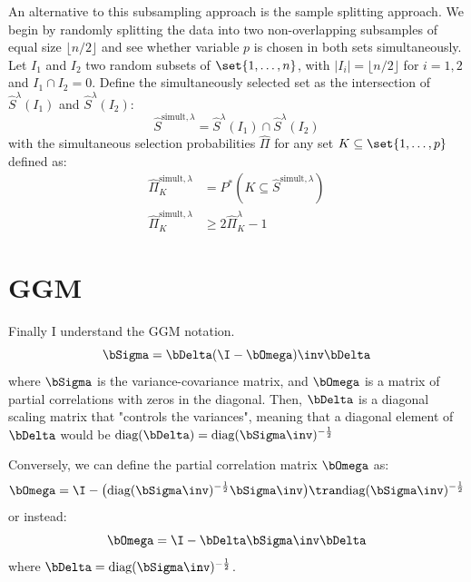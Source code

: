 An alternative to this subsampling approach is the sample splitting approach. We begin by randomly splitting the data into two non-overlapping subsamples of equal size $\lfloor n/2 \rfloor$ and see whether variable $p$ is chosen in both sets simultaneously. Let $I_1$ and $I_2$ two random subsets of $\set{1,\ldots,n}$, with $|I_i| = \lfloor n/2 \rfloor$ for $i = 1,2$ and $I_1 \cap I_2 = 0$. Define the simultaneously selected set as the intersection of $\hat{S}^{\lambda}(I_1)$ and $\hat{S}^{\lambda}(I_2)$:
\begin{equation}
    \hat{S}^{\text{simult},\lambda} = \hat{S}^{\lambda}(I_1) \cap \hat{S}^{\lambda}(I_2)
\end{equation}
with the simultaneous selection probabilities $\hat{\Pi}$ for any set $K \subseteq \set{1,\ldots,p}$ defined as:
\begin{equation}
    \begin{split}
        \hat{\Pi}_K^{\text{simult},\lambda} &= P^*(K\subseteq\hat{S}^{\text{simult},\lambda}) \\
        \hat{\Pi}_K^{\text{simult},\lambda} &\geq 2\hat{\Pi}_K^{\lambda} - 1
    \end{split}
\end{equation}
\begin{equation}
\end{equation}

\chapter{GGM}
\label{app:N}
Finally I understand the GGM notation.
\begin{equation}
    \bSigma = \bDelta (\I - \bOmega)\inv \bDelta
\end{equation}
where $\bSigma$ is the variance-covariance matrix, and $\bOmega$ is a matrix of partial correlations with zeros in the diagonal. Then, $\bDelta$ is a diagonal scaling matrix that "controls the variances", meaning that a diagonal element of $\bDelta$ would be $\text{diag}(\bDelta) = \text{diag}(\bSigma\inv)^{-\frac{1}{2}}$ 

Conversely, we can define the partial correlation matrix $\bOmega$ as:
\begin{equation}
    \bOmega = \I - \big(\text{diag}(\bSigma\inv)^{-\frac{1}{2}} \bSigma\inv\big)\tran \text{diag}(\bSigma\inv)^{-\frac{1}{2}}
\end{equation}
or instead:
\begin{equation}
    \bOmega = \I - \bDelta \bSigma\inv \bDelta
\end{equation}
where $\bDelta = \text{diag}(\bSigma\inv)^{-\frac{1}{2}}$.